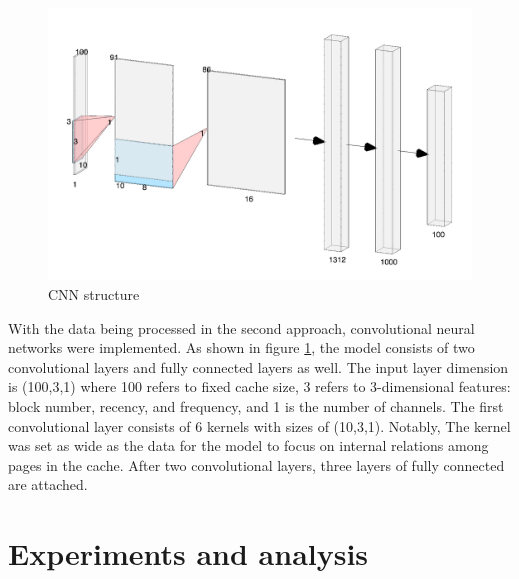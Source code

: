 \documentclass[letterpaper,twocolumn,10pt]{article}
\begin{document}
\begin{figure}[!ht]
	\centering 
	\includegraphics[width=0.38\textheight]{NN.png}
	\caption{CNN structure}
	\label{fig:nn_design}
\end{figure}


With the data being processed in the second approach, convolutional neural networks were implemented. As shown in figure \ref{fig:nn_design}, the model consists of two convolutional layers and fully connected layers as well. The input layer dimension is (100,3,1) where 100 refers to fixed cache size, 3 refers to 3-dimensional features: block number, recency, and frequency, and 1 is the number of channels. The first convolutional layer consists of 6 kernels with sizes of (10,3,1). Notably, The kernel was set as wide as the data for the model to focus on internal relations among pages in the cache. After two convolutional layers, three layers of fully connected are attached.

\section{Experiments and analysis}
\end{document}
